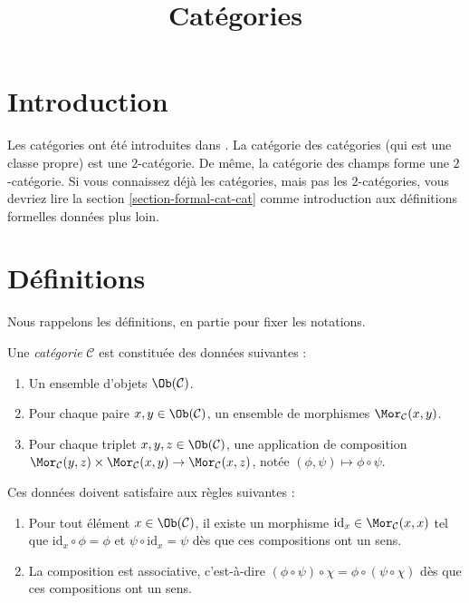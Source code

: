 


%


\title{Catégories}


\maketitle

\label{section-phantom}

\tableofcontents

\section{Introduction}
\label{section-introduction}

\noindent
Les catégories ont été introduites dans \cite{GenEqui}.
La catégorie des catégories (qui est une classe propre)
est une $2$-catégorie. De même, la catégorie des champs
forme une $2$-catégorie. Si vous connaissez déjà
les catégories, mais pas les $2$-catégories, vous devriez lire
la section \ref{section-formal-cat-cat}
comme introduction aux définitions formelles données plus loin.

\section{Définitions}
\label{section-definition-categories}

\noindent
Nous rappelons les définitions, en partie pour fixer les notations.

\begin{definition}
\label{definition-category}
Une {\it catégorie} $\mathcal{C}$ est constituée des données suivantes :
\begin{enumerate}
\item Un ensemble d'objets $\Ob(\mathcal{C})$.
\item Pour chaque paire $x, y \in \Ob(\mathcal{C})$, un ensemble de morphismes
$\Mor_\mathcal{C}(x, y)$.
\item Pour chaque triplet $x, y, z\in \Ob(\mathcal{C})$, une application de
composition $ \Mor_\mathcal{C}(y, z) \times \Mor_\mathcal{C}(x, y)
\to \Mor_\mathcal{C}(x, z) $, notée $(\phi, \psi) \mapsto
\phi \circ \psi$.
\end{enumerate}
Ces données doivent satisfaire aux règles suivantes :
\begin{enumerate}
\item Pour tout élément $x\in \Ob(\mathcal{C})$, il existe un
morphisme $\text{id}_x\in \Mor_\mathcal{C}(x, x)$ tel que
$\text{id}_x \circ \phi = \phi$ et $\psi \circ \text{id}_x = \psi $ dès que
ces compositions ont un sens.
\item La composition est associative, c'est-à-dire
$(\phi \circ \psi) \circ \chi =
\phi \circ ( \psi \circ \chi)$ dès que ces compositions ont un sens.
\end{enumerate}
\end{definition}

